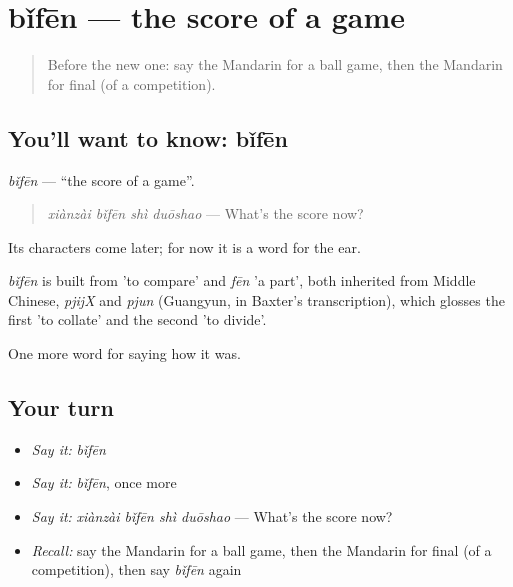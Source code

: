 \section[bǐfēn]{bǐfēn — the score of a game}

\label{lesson:ZH-C500-bifen}



\begin{quote}
Before the new one: say the Mandarin for a ball game, then the Mandarin for final (of a competition).
\end{quote}

\subsection*{You'll want to know: bǐfēn}
\emph{bǐfēn} — \textquotedblleft{}the score of a game\textquotedblright{}.

\begin{quote}
\emph{xiànzài bǐfēn shì duōshao} — What's the score now?
\end{quote}

Its characters come later; for now it is a word for the ear.

\begin{cousinweb}
\emph{bǐfēn} is built from  'to compare' and \emph{fēn} 'a part', both inherited from Middle Chinese, \emph{pjijX} and \emph{pjun} (Guangyun, in Baxter's transcription), which glosses the first 'to collate' and the second 'to divide'.
\end{cousinweb}

\begin{grammarlens}[title={What you've built}]
One more word for saying how it was.
\end{grammarlens}

\subsection*{Your turn}
\begin{itemize}
\raggedright
  \item \emph{Say it:} \emph{bǐfēn}
  \item \emph{Say it:} \emph{bǐfēn}, once more
  \item \emph{Say it:} \emph{xiànzài bǐfēn shì duōshao} — What's the score now?
  \item \emph{Recall:} say the Mandarin for a ball game, then the Mandarin for final (of a competition), then say \emph{bǐfēn} again
\end{itemize}

